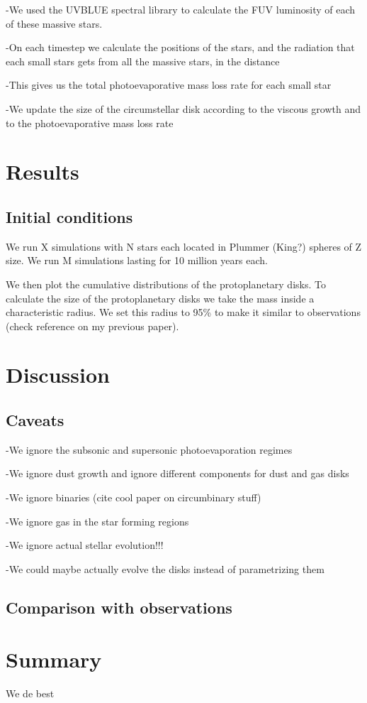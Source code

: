 \documentclass[fleqn,usenatbib]{mnras}
\begin{document}
-We used the UVBLUE spectral library to calculate the FUV luminosity of each of these massive stars.

-On each timestep we calculate the positions of the stars, and the radiation that each small stars gets from all the massive stars, in the distance

-This gives us the total photoevaporative mass loss rate for each small star

-We update the size of the circumstellar disk according to the viscous growth and to the photoevaporative mass loss rate

\section{Results}
\label{sec:results}

\subsection{Initial conditions}
We run X simulations with N stars each located in Plummer (King?) spheres of Z size. We run M simulations lasting for 10 million years each. 

We then plot the cumulative distributions of the protoplanetary disks. To calculate the size of the protoplanetary disks we take the mass inside a characteristic radius. We set this radius to 95\% to make it similar to observations (check reference on my previous paper).

\section{Discussion}
\label{sec:discussion}

\subsection{Caveats}
-We ignore the subsonic and supersonic photoevaporation regimes 

-We ignore dust growth and ignore different components for dust and gas disks 

-We ignore binaries (cite cool paper on circumbinary stuff)

-We ignore gas in the star forming regions

-We ignore actual stellar evolution!!!

-We could maybe actually evolve the disks instead of parametrizing them

\subsection{Comparison with observations}

\section{Summary}
\label{sec:summary}

We de best

\bsp	%


\label{lastpage}
\end{document}

